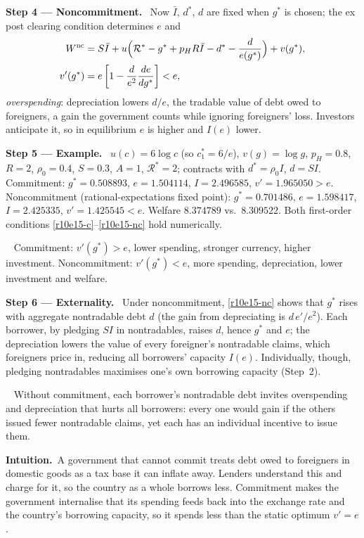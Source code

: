 \documentclass[11pt,a4paper]{article}
\newcommand{\step}[2]{\par\medskip\noindent\textbf{Step #1 --- #2.}~}
\newcommand{\intuition}{\par\medskip\noindent\textbf{Intuition.}~}
\newcommand{\answer}[1]{\par\smallskip\noindent\fbox{\textbf{Answer\if\relax\detokenize{#1}\relax\else\ #1\fi.}}~}
\newcommand{\Rc}{\mathcal{R}}
\begin{document}
\step{4}{Noncommitment} Now $\bar I$, $d^*$, $d$ are fixed when $g^*$ is chosen; the ex post clearing condition determines $e$ and
\begin{align}
  W^{\text{nc}} &= S\bar I+u\Bigl(\Rc^*-g^*+p_HR\bar I-d^*-\frac{d}{e(g^*)}\Bigr)+v(g^*), \nonumber\\
  v'(g^*) &= e\left[1-\frac{d}{e^2}\frac{de}{dg^*}\right]<e, \label{r10e15-nc}
\end{align}
\emph{overspending}: depreciation lowers $d/e$, the tradable value of debt owed to foreigners, a gain the government counts while ignoring foreigners' loss. Investors anticipate it, so in equilibrium $e$ is higher and $I(e)$ lower.

\step{5}{Example} $u(c)=6\log c$ (so $c_1^*=6/e$), $v(g)=\log g$, $p_H=0.8$, $R=2$, $\rho_0=0.4$, $S=0.3$, $A=1$, $\Rc^*=2$; contracts with $d^*=\rho_0I$, $d=SI$. Commitment: $g^*=0.508893$, $e=1.504114$, $I=2.496585$, $v'=1.965050>e$. Noncommitment (rational-expectations fixed point): $g^*=0.701486$, $e=1.598417$, $I=2.425335$, $v'=1.425545<e$. Welfare $8.374789$ vs.\ $8.309522$. Both first-order conditions \eqref{r10e15-c}--\eqref{r10e15-nc} hold numerically.

\answer{(iii)} Commitment: $v'(g^*)>e$, lower spending, stronger currency, higher investment. Noncommitment: $v'(g^*)<e$, more spending, depreciation, lower investment and welfare.

\step{6}{Externality} Under noncommitment, \eqref{r10e15-nc} shows that $g^*$ rises with aggregate nontradable debt $d$ (the gain from depreciating is $d\,e'/e^2$). Each borrower, by pledging $SI$ in nontradables, raises $d$, hence $g^*$ and $e$; the depreciation lowers the value of every foreigner's nontradable claims, which foreigners price in, reducing all borrowers' capacity $I(e)$. Individually, though, pledging nontradables maximises one's own borrowing capacity (Step~2).

\answer{(iv)} Without commitment, each borrower's nontradable debt invites overspending and depreciation that hurts all borrowers: every one would gain if the others issued fewer nontradable claims, yet each has an individual incentive to issue them.

\intuition A government that cannot commit treats debt owed to foreigners in domestic goods as a tax base it can inflate away. Lenders understand this and charge for it, so the country as a whole borrows less. Commitment makes the government internalise that its spending feeds back into the exchange rate and the country's borrowing capacity, so it spends less than the static optimum $v'=e$.
\end{document}
